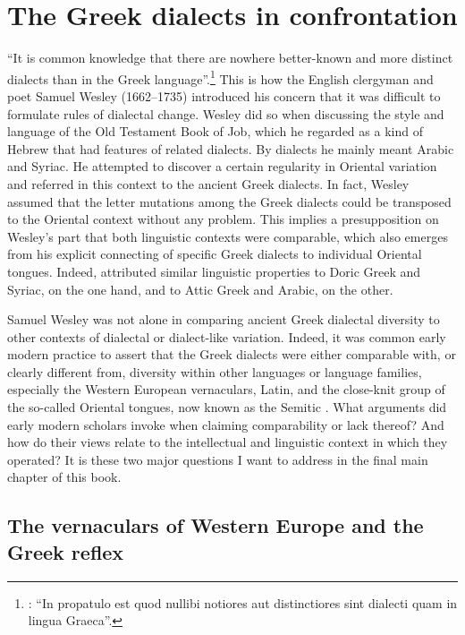 \chapter{The Greek dialects in confrontation}\label{chap:8}

“It is common knowledge that there are nowhere better-known and more distinct dialects than in the Greek language”.\footnote{\citet[23]{Wesley1736}: “In propatulo est quod nullibi notiores aut distinctiores sint dialecti quam in lingua Graeca”.} This is how the English clergyman and poet Samuel Wesley (1662–1735) introduced his concern that it was difficult to formulate rules of dialectal change. Wesley did so when discussing the style and language of the Old Testament Book of Job, which he regarded as a kind of Hebrew that had features of related dialects. By dialects he mainly meant Arabic and Syriac. He attempted to discover a certain regularity in Oriental variation and referred in this context to the ancient Greek dialects. In fact, Wesley assumed that the letter mutations among the Greek dialects could be transposed to the Oriental context without any problem. This implies a presupposition on Wesley’s part that both linguistic contexts were comparable, which also emerges from his explicit connecting of specific Greek dialects to individual Oriental tongues. Indeed, \citet[24]{Wesley1736} attributed similar linguistic properties to Doric Greek and Syriac, on the one hand, and to Attic Greek and Arabic, on the other.

Samuel Wesley was not alone in comparing ancient Greek dialectal diversity to other contexts of dialectal or dialect-like variation. Indeed, it was common early modern practice to assert that the Greek dialects were either comparable with, or clearly different from, diversity within other languages or language families, especially the Western European vernaculars, Latin, and the close-knit group of the so-called Oriental tongues, now known as the Semitic . What arguments did early modern scholars invoke when claiming comparability or lack thereof? And how do their views relate to the intellectual and linguistic context in which they operated? It is these two major questions I want to address in the final main chapter of this book.

\section{The vernaculars of Western Europe and the Greek reflex}\label{sec:8.1}

